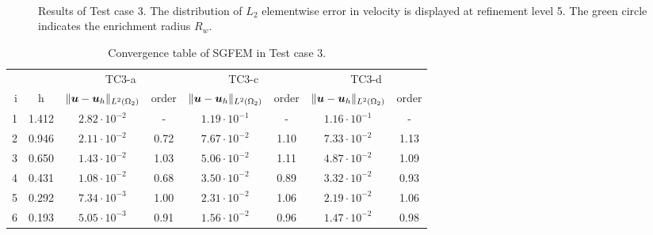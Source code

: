 %
\begin{figure}[!htb]
    \centering
     \\
    \caption
    {Results of Test case 3. The distribution of $L_2$ elementwise error in velocity is displayed at refinement level 5.
    The green circle indicates the enrichment radius $R_w$. }
    \label{fig:mh_tc3_error}
\end{figure}

\begin{table}[!htb]
\begin{center}
\bgroup
\def\arraystretch{1.2}
\setlength\tabcolsep{5pt}
\begin{tabular}{rc|cc|cc|cc}
\toprule
\multicolumn{2}{c|}{} & \multicolumn{2}{c|}{ TC3-a } & \multicolumn{2}{c|}{ TC3-c } & \multicolumn{2}{c}{TC3-d}\\ [3pt] %
i & h & $\|\mathbf{\boldsymbol{u}}-\mathbf{\boldsymbol{u}}_h\|_{L^2(\Omega_2)}$ & order & $\|\mathbf{\boldsymbol{u}}-\mathbf{\boldsymbol{u}}_h\|_{L^2(\Omega_2)}$
    & order & $\|\mathbf{\boldsymbol{u}}-\mathbf{\boldsymbol{u}}_h\|_{L^2(\Omega_2)}$ & order \\ [3pt] \midrule
1 & 1.412 & $2.82\cdot10^{-2}$  &  -   & $1.19\cdot10^{-1}$  &  -   & $1.16\cdot10^{-1}$ &   -   \\
2 & 0.946 & $2.11\cdot10^{-2}$  & 0.72 & $7.67\cdot10^{-2}$  & 1.10 & $7.33\cdot10^{-2}$ &  1.13 \\
3 & 0.650 & $1.43\cdot10^{-2}$  & 1.03 & $5.06\cdot10^{-2}$  & 1.11 & $4.87\cdot10^{-2}$ &  1.09 \\
4 & 0.431 & $1.08\cdot10^{-2}$  & 0.68 & $3.50\cdot10^{-2}$  & 0.89 & $3.32\cdot10^{-2}$ &  0.93 \\
5 & 0.292 & $7.34\cdot10^{-3}$  & 1.00 & $2.31\cdot10^{-2}$  & 1.06 & $2.19\cdot10^{-2}$ &  1.06 \\
6 & 0.193 & $5.05\cdot10^{-3}$  & 0.91 & $1.56\cdot10^{-2}$  & 0.96 & $1.47\cdot10^{-2}$ &  0.98 \\
\bottomrule
\end{tabular}
\caption{Convergence table of SGFEM in Test case 3.}
\label{tab:mh_tc3_convergence}
\egroup
\end{center}
\end{table}

